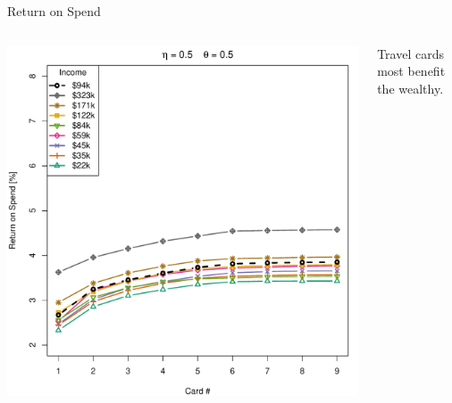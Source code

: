 \begin{frame}{Return on Spend}
    \begin{columns}[c]
        \begin{column}{0.7\textwidth}
            \includegraphics[width=0.9\textheight]{../Figures/ROSvsKvsIncome_05_05.pdf}
        \end{column}
        \begin{column}{0.3\textwidth}
            \centering
            Travel cards most benefit the wealthy.
        \end{column}
    \end{columns}
\end{frame} 

